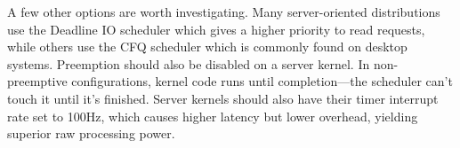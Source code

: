 A few other options are worth investigating. Many server-oriented distributions use the Deadline IO scheduler which gives a higher priority to read requests, while others use the CFQ scheduler which is commonly found on desktop systems. Preemption should also be disabled on a server kernel. In non-preemptive configurations, kernel code runs until completion---the scheduler can't touch it until it's finished. Server kernels should also have their timer interrupt rate set to 100Hz, which causes higher latency but lower overhead, yielding superior raw processing power.
